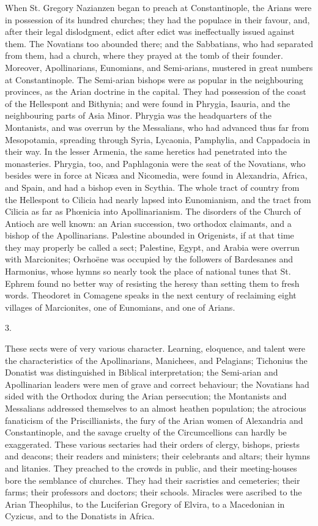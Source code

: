 When St. Gregory Nazianzen began to preach at
Constantinople, the Arians were in possession of its
hundred churches; they had the populace in their favour,
and, after their legal dislodgment, edict after edict was
ineffectually issued against them. The Novatians too
abounded there; and the Sabbatians, who had separated
from them, had a church, where they prayed at the tomb of
their founder. Moreover, Apollinarians, Eunomians, and
Semi-arians, mustered in great numbers at Constantinople.
The Semi-arian bishops were as popular in the
neighbouring provinces, as the Arian doctrine in the
capital. They had possession of the coast of the
Hellespont and Bithynia; and were found in Phrygia,
Isauria, and the neighbouring parts of Asia Minor.
Phrygia was the headquarters of the Montanists, and was
overrun by the Messalians, who had advanced thus far from
Mesopotamia, spreading through Syria, Lycaonia,
Pamphylia, and Cappadocia in their way. In the lesser
Armenia, the same heretics had penetrated into the
monasteries. Phrygia, too, and Paphlagonia were the seat
of the Novatians, who besides were in force at Nicæa and
Nicomedia, were found in Alexandria, Africa, and Spain,
and had a bishop even in Scythia. The whole tract of
country from the Hellespont to Cilicia had nearly lapsed
into Eunomianism, and the tract from Cilicia as far as Phœnicia into Apollinarianism. The disorders of the
Church of Antioch are well known: an Arian succession,
two orthodox claimants, and a bishop of the
Apollinarians. Palestine abounded in Origenists, if at
that time they may properly be called a sect; Palestine,
Egypt, and Arabia were overrun with Marcionites;
Osrhoëne was occupied by the followers of Bardesanes and
Harmonius, whose hymns so nearly took the place of
national tunes that St. Ephrem found no better way of
resisting the heresy than setting them to fresh words.
Theodoret in Comagene speaks in the next century of
reclaiming eight villages of Marcionites, one of
Eunomians, and one of Arians.

3.

These sects were of very various character. Learning,
eloquence, and talent were the characteristics of the
Apollinarians, Manichees, and Pelagians; Tichonius the
Donatist was distinguished in Biblical interpretation;
the Semi-arian and Apollinarian leaders were men of grave
and correct behaviour; the Novatians had sided with the
Orthodox during the Arian persecution; the Montanists and
Messalians addressed themselves to an almost heathen
population; the atrocious fanaticism of the Priscillianists, the fury of the Arian women of
Alexandria and Constantinople, and the savage cruelty of
the Circumcellions can hardly be exaggerated. These
various sectaries had their orders of clergy, bishops,
priests and deacons; their readers and ministers; their
celebrants and altars; their hymns and litanies. They
preached to the crowds in public, and their
meeting-houses bore the semblance of churches. They had
their sacristies and cemeteries; their farms; their
professors and doctors; their schools. Miracles were
ascribed to the Arian Theophilus, to the Luciferian
Gregory of Elvira, to a Macedonian in Cyzicus, and to the
Donatists in Africa.

